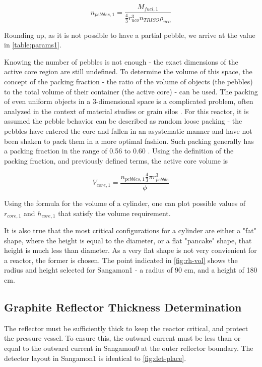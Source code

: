 \begin{equation}
n_{pebbles,1} = \frac{M_{fuel,1}}{\frac{4}{3}r_{uco}^3n_{TRISO}\rho_{uco}}
\end{equation}

Rounding up, as it is not possible to have a partial pebble, we arrive at the value in \ref{table:params1}.

Knowing the number of pebbles is not enough - the exact dimensions of the active core region are still undefined.  To determine the volume of this space, the concept of the packing fraction - the ratio of the volume of objects (the pebbles) to the total volume of their container (the active core) - can be used.  The packing of even uniform objects in a 3-dimensional space is a complicated problem, often analyzed in the context of material studies or grain silos \cite{tulluri_analysis_nodate}.  For this reactor, it is assumed the pebble behavior can be described as random loose packing \cite{tulluri_analysis_nodate} - the pebbles have entered the core and fallen in an asystematic manner and have not been shaken to pack them in a more optimal fashion.  Such packing generally has a packing fraction in the range of 0.56 to 0.60 \cite{tulluri_analysis_nodate}.  Using the definition of the packing fraction, and previously defined terms, the active core volume is

\begin{equation}
V_{core,1} = \frac{ n_{pebbles,1}\frac{4}{3}\pi r_{pebble}^3 }{ \phi }
\end{equation}

Using the formula for the volume of a cylinder, one can plot possible values of $r_{core,1}$ and $h_{core,1}$ that satisfy the volume requirement.



It is also true that the most critical configurations for a cylinder are either a "fat" shape, where the height is equal to the diameter, or a flat "pancake" shape, that height is much less than diameter.  As a very flat shape is not very convienient for a reactor, the former is chosen.  The point indicated in \ref{fig:rh-vol} shows the radius and height selected for Sangamon1 - a radius of 90 cm, and a height of 180 cm.

\subsection{Graphite Reflector Thickness Determination}

The reflector must be sufficiently thick to keep the reactor critical, and protect the pressure vessel.  To ensure this, the outward current must be less than or equal to the outward current in Sangamon0 at the outer reflector boundary.  The detector layout in Sangamon1 is identical to \ref{fig:det-place}.

